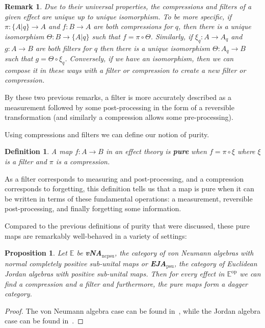 \documentclass[a4paper,onecolumn,10pt,accepted=2019-05-03, issue=1, volume=1, shorttitle=papers/compositionality-1-1]{compositionalityarticle}
\newcounter{counter}
\numberwithin{counter}{section}
\newtheorem{proposition}[counter]{Proposition}
\newtheorem{definition}[counter]{Definition}
\newtheorem{remark}[counter]{Remark}
\begin{document}
\begin{remark}
    Due to their universal properties, the compressions and filters of a given effect are unique up to unique isomorphism. To be more specific, if $\pi:\{A\lvert q\}\rightarrow A$ and $f:B\rightarrow A$ are both compressions for $q$, then there is a unique isomorphism $\Theta:B\rightarrow \{A\lvert q\}$ such that $f = \pi\circ\Theta$. Similarly, if $\xi_q:A\rightarrow A_q$ and $g:A\rightarrow B$ are both filters for $q$ then there is a unique isomorphism $\Theta:A_q\rightarrow B$ such that $g=\Theta\circ\xi_q$. 
    Conversely, if we have an isomorphism, then we can compose it in these ways with a filter or compression to create a new filter or compression.
\end{remark}

By these two previous remarks, a filter is more accurately described as a measurement followed by some post-processing in the form of a reversible transformation (and similarly a compression allows some pre-processing).

Using compressions and filters we can define our notion of purity.
\begin{definition}\label{def:pure}
    A map $f:A\rightarrow B$ in an effect theory is \textbf{pure} when $f=\pi\circ\xi$ where $\xi$ is a filter and $\pi$ is a compression.
\end{definition}

As a filter corresponds to measuring and post-processing, and a compression corresponds to forgetting, this definition tells us that a map is pure when it can be written in terms of these fundamental operations: a measurement, reversible post-processing, and finally forgetting some information.

Compared to the previous definitions of purity that were discussed, these pure maps are remarkably well-behaved in a variety of settings:

\begin{proposition}
    Let $\mathbb{E}$ be \textbf{vNA}$_{\text{ncpsu}}$, the category of von Neumann algebras with normal completely positive sub-unital maps or \textbf{EJA}$_{\text{psu}}$, the category of Euclidean Jordan algebras with positive sub-unital maps. Then for every effect in $\mathbb{E}^{\text{op}}$ we can find a compression and a filter and furthermore, the pure maps form a dagger category.
\end{proposition}
\begin{proof}
    The von Neumann algebra case can be found in~\cite{westerbaan2016universal,bramthesis}, while the Jordan algebra case can be found in~\cite{westerbaan2018puremaps}.
\end{proof}
\end{document}
